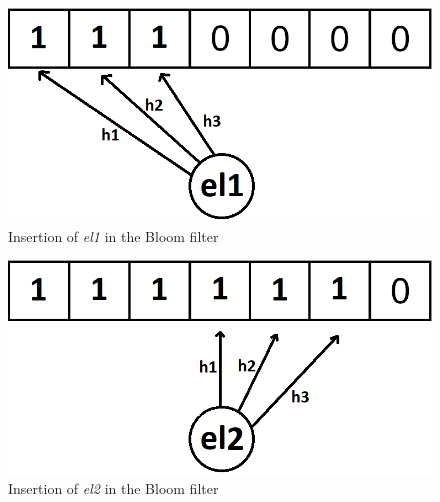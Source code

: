 \begin{figure}[!htb]
    \begin{center}
      \includegraphics[scale=0.4]{figures/fp-bloom-1.png}
      \caption[Bloom filter insertion of \textit{el1}]{Insertion of \textit{el1} in the Bloom filter}
      \label{fig:bloom-filter-fp1}
    \end{center}
\end{figure}

\begin{figure}[!htb]
    \begin{center}
      \includegraphics[scale=0.4]{figures/fp-bloom-2.png}
      \caption[Bloom filter insertion of \textit{el2}]{Insertion of \textit{el2} in the Bloom filter}
      \label{fig:bloom-filter-fp2}
    \end{center}
\end{figure}

